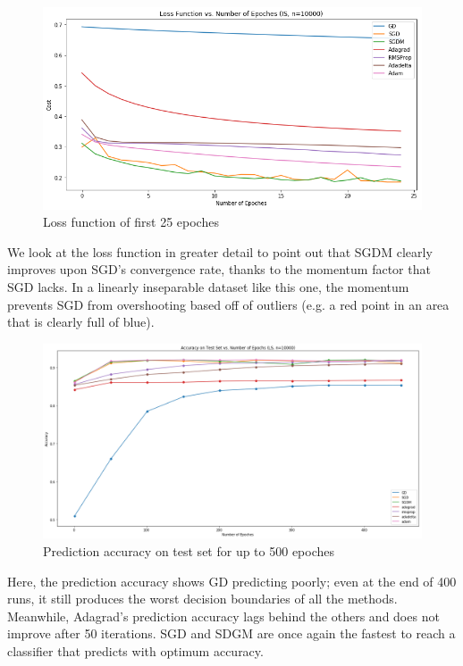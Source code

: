 \documentclass[twoside,11pt]{homework}
\begin{document}
	\begin{figure}[H]
		\centering
		\includegraphics[scale=.5]{q5/insep_10000/loss_n25.png}
		\caption{Loss function of first 25 epoches}
	\end{figure}

We look at the loss function in greater detail to point out that SGDM clearly improves upon SGD's convergence rate, thanks to the momentum factor that SGD lacks. In a linearly inseparable dataset like this one, the momentum prevents SGD from overshooting based off of outliers (e.g. a red point in an area that is clearly full of blue).

	\begin{figure}[H]
		\centering
		\includegraphics[scale=.3]{q5/insep_10000/acc_500.png}
		\caption{Prediction accuracy on test set for up to 500 epoches}
	\end{figure}

Here, the prediction accuracy shows GD predicting poorly; even at the end of 400 runs, it still produces the worst decision boundaries of all the methods. Meanwhile, Adagrad's prediction accuracy lags behind the others and does not improve after 50 iterations. SGD and SDGM are once again the fastest to reach a classifier that predicts with optimum accuracy.
\end{document}
